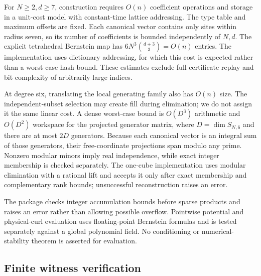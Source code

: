 \documentclass[11pt]{article}
\theoremstyle{remark}
\begin{document}
For $N\ge2,d\ge7$, construction requires $O(n)$ coefficient operations
and storage in a unit-cost model with constant-time lattice addressing.
The type table and maximum offsets are fixed. Each canonical vector
contains only sites within radius seven, so its number of coefficients
is bounded independently of $N,d$. The explicit tetrahedral Bernstein
map has $6N^3\binom{d+3}{3}=O(n)$ entries. The implementation uses
dictionary addressing, for which this cost is expected rather than a
worst-case hash bound. These estimates exclude full certificate replay
and bit complexity of arbitrarily large indices.

At degree six, translating the local generating family also has $O(n)$
size. The independent-subset selection may create fill during elimination;
we do not assign it the same linear cost. A dense worst-case bound is
$O(D^3)$ arithmetic and $O(D^2)$ workspace for the projected generator
matrix, where $D=\dim S_{N,6}$ and there are at most $2D$ generators.
Because each canonical vector is an integral sum of those generators,
their free-coordinate projections span modulo any prime. Nonzero modular
minors imply real independence, while exact integer membership is checked
separately. The one-cube implementation uses modular elimination with a
rational lift and accepts it only after exact membership and complementary
rank bounds; unsuccessful reconstruction raises an error.

The package checks integer accumulation bounds before sparse products
and raises an error rather than allowing possible overflow. Pointwise
potential and physical-curl evaluation uses floating-point Bernstein
formulas and is tested separately against a global polynomial field.
No conditioning or numerical-stability theorem is asserted for evaluation.

\subsection{Finite witness verification}\label{sec:verification}
\end{document}
